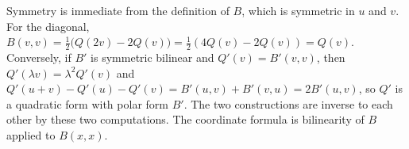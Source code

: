 Symmetry is immediate from the definition of $B$, which is symmetric in $u$ and $v$. For the diagonal, $B(v, v) = \tfrac12\bigl(Q(2v) - 2Q(v)\bigr) = \tfrac12(4Q(v) - 2Q(v)) = Q(v)$. Conversely, if $B'$ is symmetric bilinear and $Q'(v) = B'(v, v)$, then $Q'(\lambda v) = \lambda^{2} Q'(v)$ and $Q'(u+v) - Q'(u) - Q'(v) = B'(u, v) + B'(v, u) = 2B'(u, v)$, so $Q'$ is a quadratic form with polar form $B'$. The two constructions are inverse to each other by these two computations. The coordinate formula is bilinearity of $B$ applied to $B(x, x)$.
